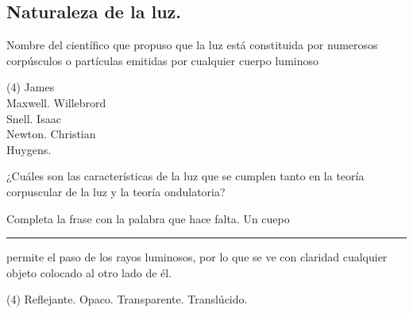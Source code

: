 \documentclass[12pt, letter]{exam}
\begin{document}


\newpage

\begin{questions}
    
    \section{Naturaleza de la luz.}
    
    \question Nombre del científico que propuso que la luz está constituida por numerosos corpúsculos o partículas emitidas por cualquier cuerpo luminoso
    \begin{tasks}(4)
        \task James \\ Maxwell.
        \task Willebrord \\ Snell.
        \task Isaac \\ Newton.
        \task Christian \\ Huygens.
    \end{tasks}
    \question ¿Cuáles son las características de la luz que se cumplen tanto en la teoría corpuscular de la luz y la teoría ondulatoria?
    \question Completa la frase con la palabra que hace falta. Un cuepo \rule{2cm}{0.1mm} permite el paso de los rayos luminosos, por lo que se ve con claridad cualquier objeto colocado al otro lado de él.
    \begin{tasks}(4)
        \task Reflejante.
        \task Opaco.
        \task Transparente.
        \task Translúcido.
    \end{tasks}
    

\end{questions}
\end{document}

